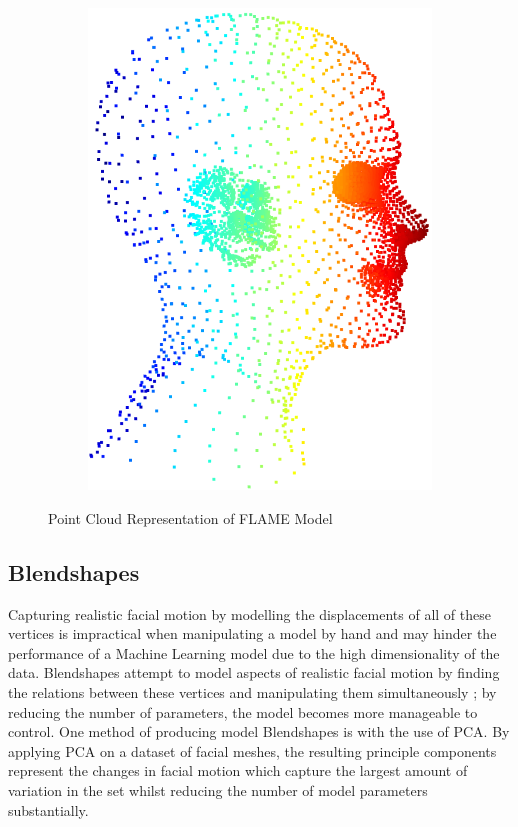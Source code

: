 \begin{figure}[h]
\begin{subfigure}[b]{0.28\textwidth}
        \includegraphics[width=\textwidth]{figures/dataset/flame_side.png}
    \end{subfigure}
    \caption{Point Cloud Representation of FLAME Model \cite{Li2017}}\label{fig:FLAME_Point_Cloud}
\end{figure}

\subsection{Blendshapes} \label{blendshapes}
Capturing realistic facial motion by modelling the displacements of all of these vertices is impractical when manipulating a model by hand and may hinder the performance of a Machine Learning model due to the high dimensionality of the data.
Blendshapes attempt to model aspects of realistic facial motion by finding the relations between these vertices and manipulating them simultaneously \cite{Lewis2010}; by reducing the number of parameters, the model becomes more manageable to control.
One method of producing model Blendshapes is with the use of PCA.
By applying PCA on a dataset of facial meshes, the resulting principle components represent the changes in facial motion which capture the largest amount of variation in the set whilst reducing the number of model parameters substantially.

